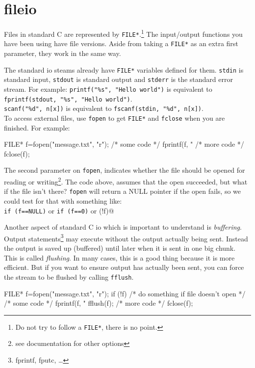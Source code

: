 
\chapter{fileio}

Files in standard C are represented by \texttt{FILE*}.\footnote{Do not try to follow a \texttt{FILE*}, there is no point.}
The input/output functions you have been using have file versions.
Aside from taking a \texttt{FILE*} as an extra first parameter, they work in the same way.

The standard io steams already have \texttt{FILE*} variables defined for them.
\texttt{stdin} is standard input, \texttt{stdout} is standard output and \texttt{stderr} is the standard error stream. 
For example:
\lstinline!printf("%s", "Hello world")! is equivalent to \lstinline!fprintf(stdout, "%s", "Hello world")!.\\
\lstinline!scanf("%d", n[x])! is equivalent to \lstinline!fscanf(stdin, "%d", n[x])!.\\

To access external files, use \texttt{fopen} to get \texttt{FILE*} and \texttt{fclose} when you are finished.
For example:
\begin{codeinline}
FILE* f=fopen("message.txt", "r");
/* some code */
fprintf(f, "%
/* more code */
fclose(f);
\end{codeinline}
The second parameter on \texttt{fopen}, indicates whether the file should be opened for reading or writing\footnote{see documentation for other options}.
The code above, assumes that the open succeeded, but what if the file isn't there?
\texttt{fopen} will return a NULL pointer if the open fails, so we could test for that with something like:\\
\lstinline!if (f==NULL)! or \lstinline!if (f==0)! or \lstinline@if (!f)@

Another aspect of standard C io which is important to understand is \emph{buffering}.
Output statements\footnote{fprintf, fputc, \ldots} may execute without the output actually being sent.
Instead the output is saved up (buffered) until later when it is sent in one big chunk.
This is called \emph{flushing}.
In many cases, this is a good thing because it is more efficient.
But if you want to ensure output has actually been sent, you can force the stream to be flushed by calling \texttt{fflush}.
\begin{codeinline}
FILE* f=fopen("message.txt", "r");
if (!f) {
    /* do something if file doesn't open */
}
/* some code */
fprintf(f, "%
fflush(f);
/* more code */
fclose(f);
\end{codeinline}

